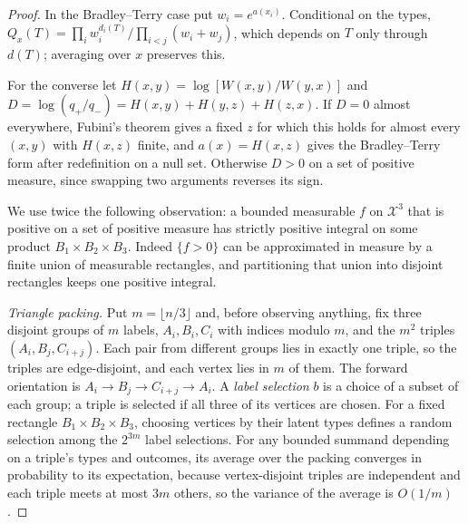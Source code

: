 \documentclass[11pt,a4paper]{article}
\theoremstyle{definition}
\begin{document}
\begin{proof}
In the Bradley--Terry case put $w_i=e^{a(x_i)}$. Conditional on the types, $Q_x(T)=\prod_i w_i^{d_i(T)}/\prod_{i<j}(w_i+w_j)$, which depends on $T$ only through $d(T)$; averaging over $x$ preserves this.

For the converse let $H(x,y)=\log[W(x,y)/W(y,x)]$ and $D=\log(q_+/q_-)=H(x,y)+H(y,z)+H(z,x)$. If $D=0$ almost everywhere, Fubini's theorem gives a fixed $z$ for which this holds for almost every $(x,y)$ with $H(x,z)$ finite, and $a(x)=H(x,z)$ gives the Bradley--Terry form after redefinition on a null set. Otherwise $D>0$ on a set of positive measure, since swapping two arguments reverses its sign.

We use twice the following observation: a bounded measurable $f$ on $\mathcal X^3$ that is positive on a set of positive measure has strictly positive integral on some product $B_1\times B_2\times B_3$. Indeed $\{f>0\}$ can be approximated in measure by a finite union of measurable rectangles, and partitioning that union into disjoint rectangles keeps one positive integral.

\emph{Triangle packing.} Put $m=\lfloor n/3\rfloor$ and, before observing anything, fix three disjoint groups of $m$ labels, $A_i,B_i,C_i$ with indices modulo $m$, and the $m^2$ triples $(A_i,B_j,C_{i+j})$. Each pair from different groups lies in exactly one triple, so the triples are edge-disjoint, and each vertex lies in $m$ of them. The forward orientation is $A_i\to B_j\to C_{i+j}\to A_i$. A \emph{label selection} $b$ is a choice of a subset of each group; a triple is selected if all three of its vertices are chosen. For a fixed rectangle $B_1\times B_2\times B_3$, choosing vertices by their latent types defines a random selection among the $2^{3m}$ label selections. For any bounded summand depending on a triple's types and outcomes, its average over the packing converges in probability to its expectation, because vertex-disjoint triples are independent and each triple meets at most $3m$ others, so the variance of the average is $O(1/m)$.


\end{proof}
\end{document}
